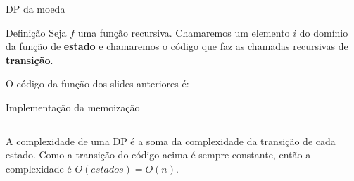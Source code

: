 \begin{frame}{DP da moeda}

    \begin{block}{Definição}
        Seja $f$ uma função recursiva. Chamaremos um elemento $i$ do domínio da função de {\bf estado} e chamaremos o código que faz as chamadas recursivas de {\bf transição}.
    \end{block}

    O código da função dos slides anteriores é:

    \begin{block}{Implementação da memoização}
        \footnotesize
        \inputminted{cpp}{codigos/moeda.cpp}    
    \end{block}
    A complexidade de uma DP é a soma da complexidade da transição de cada estado. Como a transição do código acima é sempre constante, então a complexidade é $O(estados) = O(n)$.
\end{frame}
